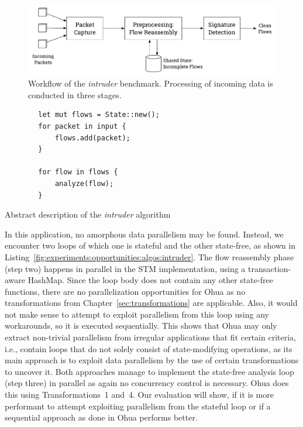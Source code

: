 \begin{figure}
    \includegraphics[width=\textwidth,keepaspectratio]{gfx/experiments-intruder}
    \caption{Workflow of the \emph{intruder} benchmark. Processing of incoming data is conducted in three stages.}%
    \label{fig:experiments:intruder:workflow}
\end{figure}

\begin{listing}
    \begin{verbatim}
        let mut flows = State::new();
        for packet in input {
            flows.add(packet);
        }

        for flow in flows {
            analyze(flow);
        }
    \end{verbatim}
    \caption{Abstract description of the \emph{intruder} algorithm}
    \label{fig:experiments:opportunities:algos:intruder}
\end{listing}

In this application, no amorphous data parallelism may be found.
Instead, we encounter two loops of which one is stateful and the other state-free, as shown in Listing~\ref{fig:experiments:opportunities:algos:intruder}.
The flow reassembly phase (step two) happens in parallel in the STM implementation, using a transaction-aware HashMap.
Since the loop body does not contain any other state-free functions, there are no parallelization opportunities for Ohua as no transformations from Chapter~\ref{sec:transformations} are applicable.
Also, it would not make sense to attempt to exploit parallelism from this loop using any workarounds, so it is executed sequentially.
This shows that Ohua may only extract non-trivial parallelism from irregular applications that fit certain criteria, i.e., contain loops that do not solely consist of state-modifying operations, as its main approach is to exploit data parallelism by the use of certain transformations to uncover it.
Both approaches manage to implement the state-free analysis loop (step three) in parallel as again no concurrency control is necessary.
Ohua does this using Transformations~1 and~4.
Our evaluation will show, if it is more performant to attempt exploiting parallelism from the stateful loop or if a sequential approach as done in Ohua performs better.

